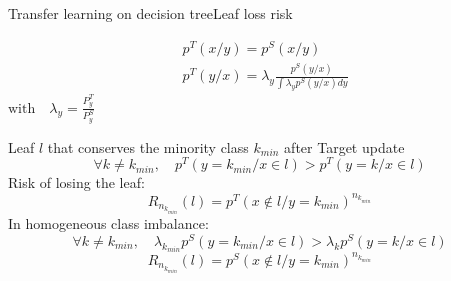 \begin{frame}{Transfer learning on decision tree}{Leaf loss risk}

\begin{minipage}[t]{0.38\textwidth}
    \vspace{0pt}
    \begin{tcolorbox}[title=Homogeneous class imbalance,size=title,boxrule=0.2pt]
    \begin{align*}
        & p^T(x/y) = p^S(x/y) \\
        & p^T(y/x) = \lambda_y \frac{p^S(y/x)}{\int{\lambda_y p^S(y/x)dy}}
    \end{align*}
        $\textrm{with} \quad \lambda_y = \frac{P_y^T}{P_y^S}$
    \end{tcolorbox}
\end{minipage}\hfill
\begin{minipage}[t]{0.59\textwidth}
    \vspace{0pt}
    \pause
    \begin{tcolorbox}[title=Leaf loss risk,size=title,boxrule=0.2pt]
            Leaf $l$ that conserves the minority class $k_{min}$ after Target update
        \begin{equation*}
        \forall k \neq k_{min},\quad {p}^T(y = k_{min} / x \in l) > {p}^T(y = k / x \in l) 
        \label{eqF_rep_targ}
        \end{equation*}
        Risk of losing the leaf:
        \begin{equation*}
        R_{n_{k_{min}}}(l)={p}^T(x \notin l / y = k_{min})^{n_{k_{min}}} 
        \label{eq_risk_value}
        \end{equation*}
        \pause
        In homogeneous class imbalance:
        \begin{equation*}
        \forall k \neq k_{min}, \quad \lambda_{k_{min}}  {p}^S(y = k_{min} / x \in l) > \lambda_k  {p}^S(y = k / x \in l)
        \end{equation*}
        \begin{equation*}
        R_{n_{k_{min}}}(l)={p}^S(x \notin l / y = k_{min})^{n_{k_{min}}}
        \end{equation*}
    \end{tcolorbox}
\end{minipage}

\end{frame}


